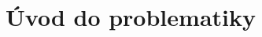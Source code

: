 \chapter{Úvod do problematiky}
\par \lipsum[3]
\cite{coplienOredevDCI}

\par \lipsum[8]
\cite{coplienGOTODCI}
\par {}